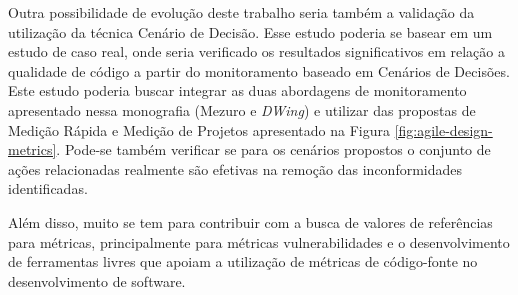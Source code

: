 Outra possibilidade de evolução deste trabalho seria também a validação da utilização da técnica Cenário de Decisão. Esse estudo poderia se basear em um estudo de caso real, onde seria verificado os resultados significativos em relação a qualidade de código a partir do monitoramento baseado em Cenários de Decisões. Este estudo poderia buscar integrar as duas abordagens de monitoramento apresentado nessa monografia (Mezuro e \emph{DWing}) e utilizar das propostas de Medição Rápida e Medição de Projetos apresentado na Figura \ref{fig:agile-design-metrics}. Pode-se também verificar se para os cenários propostos o conjunto de ações relacionadas realmente são efetivas na remoção das inconformidades identificadas.

Além disso, muito se tem para contribuir com a busca de valores de referências para métricas, principalmente para métricas vulnerabilidades e o desenvolvimento de ferramentas livres que apoiam a utilização de métricas de código-fonte no desenvolvimento de software.

%


%


